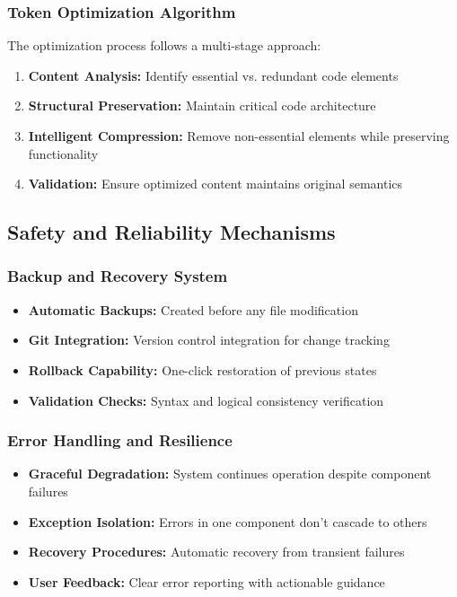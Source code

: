 \documentclass[12pt,a4paper]{article}
\begin{document}
\subsubsection{Token Optimization Algorithm}
The optimization process follows a multi-stage approach:
\begin{enumerate}
    \item \textbf{Content Analysis:} Identify essential vs. redundant code elements
    \item \textbf{Structural Preservation:} Maintain critical code architecture
    \item \textbf{Intelligent Compression:} Remove non-essential elements while preserving functionality
    \item \textbf{Validation:} Ensure optimized content maintains original semantics
\end{enumerate}

\subsection{Safety and Reliability Mechanisms}

\subsubsection{Backup and Recovery System}
\begin{itemize}
    \item \textbf{Automatic Backups:} Created before any file modification
    \item \textbf{Git Integration:} Version control integration for change tracking
    \item \textbf{Rollback Capability:} One-click restoration of previous states
    \item \textbf{Validation Checks:} Syntax and logical consistency verification
\end{itemize}

\subsubsection{Error Handling and Resilience}
\begin{itemize}
    \item \textbf{Graceful Degradation:} System continues operation despite component failures
    \item \textbf{Exception Isolation:} Errors in one component don't cascade to others
    \item \textbf{Recovery Procedures:} Automatic recovery from transient failures
    \item \textbf{User Feedback:} Clear error reporting with actionable guidance
\end{itemize}
\end{document}
